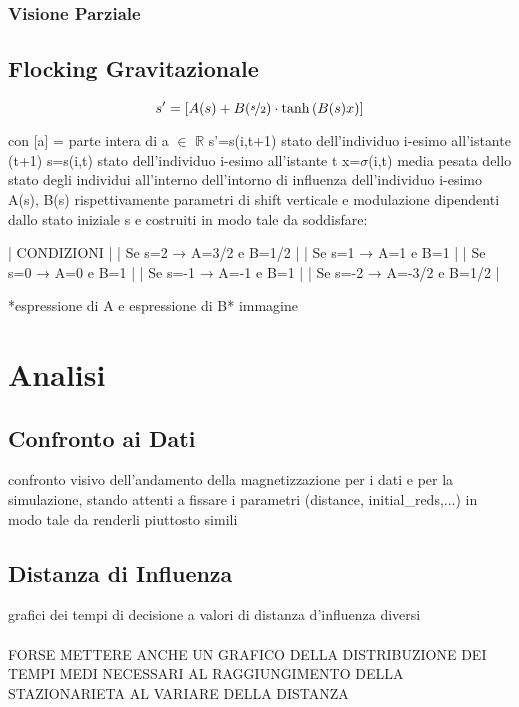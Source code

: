 \documentclass{article}
\begin{document}
\subsubsection{Visione Parziale}
\label{Sec:2.2}
\subsection{Flocking Gravitazionale}
\label{Sec:2.3}

\begin{equation}
    s'=[A(s)+B(\nicefrac{s}{2}) \cdot \tanh{(B(s)x)}]
    \label{Eq:3}
\end{equation}


con [a] = parte intera di a {\footnotesize{$\in$}} $\mathbb{R}$
       s’=s(i,t+1) stato dell’individuo i-esimo all’istante (t+1)
       s=s(i,t) stato dell’individuo i-esimo all’istante t
       x=$\sigma$(i,t) media pesata dello stato degli individui all’interno dell’intorno di influenza  
                    dell’individuo i-esimo
       A(s), B(s) rispettivamente parametri di shift verticale e modulazione dipendenti dallo stato
                    iniziale s e costruiti in modo tale da soddisfare:

                    | CONDIZIONI                         |
                    | Se s=2  → A=3/2  e  B=1/2     |
                    | Se s=1  → A=1  e  B=1           |
                    | Se s=0  → A=0  e  B=1           |
                    | Se s=-1 → A=-1  e  B=1         |
                    | Se s=-2 → A=-3/2  e  B=1/2   |
                    
*espressione di A e espressione di B*
immagine


\section{Analisi}
\label{Sec:3}
\subsection{Confronto ai Dati}
\label{Sec:3.1}
confronto visivo dell'andamento della magnetizzazione per i dati e per la simulazione, stando attenti a fissare i parametri (distance, initial\_reds,...) in modo tale da renderli piuttosto simili
\subsection{Distanza di Influenza}
\label{Sec:3.2}
grafici dei tempi di decisione a valori di distanza d'influenza diversi
\\
\\ FORSE METTERE ANCHE UN GRAFICO DELLA DISTRIBUZIONE DEI TEMPI MEDI NECESSARI AL RAGGIUNGIMENTO DELLA STAZIONARIETA AL VARIARE DELLA DISTANZA
\end{document}
